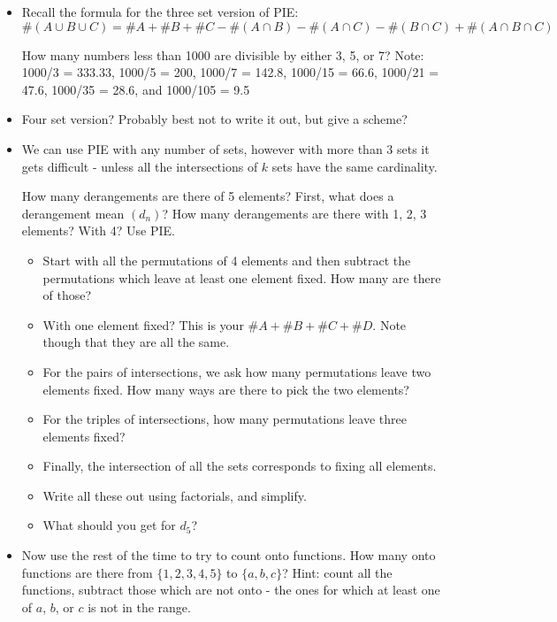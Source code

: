 \begin{itemize}
  \item Recall the formula for the three set version of PIE:
  \[\#(A \cup B \cup C) = \#A + \#B +\#C - \#(A \cap B) - \#(A \cap C) - \#(B \cap C) + \#(A \cap B \cap C)\]
  
  \ex How many numbers less than 1000 are divisible by either 3, 5, or 7?  Note: 1000/3 = 333.33, 1000/5 = 200, 1000/7 = 142.8, 1000/15 = 66.6, 1000/21 = 47.6, 1000/35 = 28.6, and 1000/105 = 9.5
  
  \item Four set version?  Probably best not to write it out, but give a scheme?
  \item We can use PIE with any number of sets, however with more than 3 sets it gets difficult - unless all the intersections of $k$ sets have the same cardinality.
  
  \ex How many derangements are there of 5 elements?  First, what does a derangement mean $(d_n)$? How many derangements are there with 1, 2, 3 elements?  With 4?  Use PIE.
  
  \begin{itemize}
    \item Start with all the permutations of 4 elements and then subtract the permutations which leave at least one element fixed.  How many are there of those?
    \item With one element fixed?  This is your $\#A + \#B + \#C + \#D$.  Note though that they are all the same.
    \item For the pairs of intersections, we ask how many permutations leave two elements fixed.  How many ways are there to pick the two elements?
    \item For the triples of intersections, how many permutations leave three elements fixed?
    \item Finally, the intersection of all the sets corresponds to fixing all elements.  
    \item Write all these out using factorials, and simplify.
    \item What should you get for $d_5$?
  \end{itemize}
  
  \item Now use the rest of the time to try to count onto functions.  How many onto functions are there from $\{1,2,3,4,5\}$ to $\{a,b,c\}$?  Hint: count all the functions, subtract those which are not onto - the ones for which at least one of $a$, $b$, or $c$ is not in the range.
\end{itemize}



